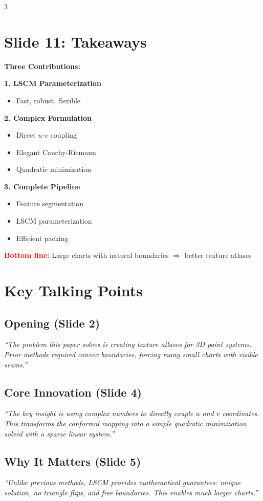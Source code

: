 \documentclass[10pt,landscape]{article}
\newcommand{\slide}[1]{\section*{Slide #1}}
\begin{document}
\begin{multicols}{3}
\slide{11: Takeaways}
\textbf{Three Contributions:}

\textbf{1. LSCM Parameterization}
\begin{itemize}
\item Fast, robust, flexible
\end{itemize}

\textbf{2. Complex Formulation}
\begin{itemize}
\item Direct $u$-$v$ coupling
\item Elegant Cauchy-Riemann
\item Quadratic minimization
\end{itemize}

\textbf{3. Complete Pipeline}
\begin{itemize}
\item Feature segmentation
\item LSCM parameterization
\item Efficient packing
\end{itemize}

\textcolor{red}{\textbf{Bottom line:}} Large charts with natural boundaries $\Rightarrow$ better texture atlases

\columnbreak

\section*{Key Talking Points}

\subsection*{Opening (Slide 2)}
\textit{``The problem this paper solves is creating texture atlases for 3D paint systems. Prior methods required convex boundaries, forcing many small charts with visible seams.''}

\subsection*{Core Innovation (Slide 4)}
\textit{``The key insight is using complex numbers to directly couple $u$ and $v$ coordinates. This transforms the conformal mapping into a simple quadratic minimization solved with a sparse linear system.''}

\subsection*{Why It Matters (Slide 5)}
\textit{``Unlike previous methods, LSCM provides mathematical guarantees: unique solution, no triangle flips, and free boundaries. This enables much larger charts.''}


\end{multicols}
\end{document}
